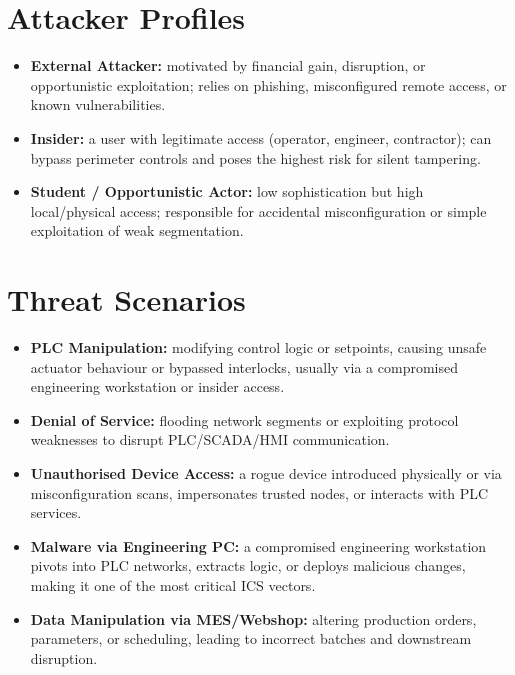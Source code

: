 \documentclass{report}
\begin{document}
\section{Attacker Profiles}

\begin{itemize}[nosep]
  \item \textbf{External Attacker:} motivated by financial gain, disruption, or opportunistic exploitation; relies on phishing, misconfigured remote access, or known vulnerabilities.
  \item \textbf{Insider:} a user with legitimate access (operator, engineer, contractor); can bypass perimeter controls and poses the highest risk for silent tampering.
  \item \textbf{Student / Opportunistic Actor:} low sophistication but high local/physical access; responsible for accidental misconfiguration or simple exploitation of weak segmentation.
\end{itemize}

\section{Threat Scenarios}

\begin{itemize}[nosep]
  \item \textbf{PLC Manipulation:} modifying control logic or setpoints, causing unsafe actuator behaviour or bypassed interlocks, usually via a compromised engineering workstation or insider access.
  \item \textbf{Denial of Service:} flooding network segments or exploiting protocol weaknesses to disrupt PLC/SCADA/HMI communication.
  \item \textbf{Unauthorised Device Access:} a rogue device introduced physically or via misconfiguration scans, impersonates trusted nodes, or interacts with PLC services.
  \item \textbf{Malware via Engineering PC:} a compromised engineering workstation pivots into PLC networks, extracts logic, or deploys malicious changes, making it one of the most critical ICS vectors.
  \item \textbf{Data Manipulation via MES/Webshop:} altering production orders, parameters, or scheduling, leading to incorrect batches and downstream disruption.
\end{itemize}

\end{document}
